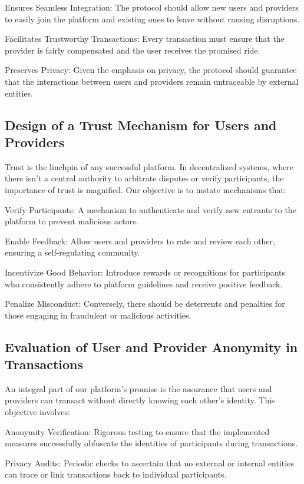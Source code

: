 Ensures Seamless Integration: The protocol should allow new users and providers to easily join the platform and existing ones to leave without causing disruptions.

Facilitates Trustworthy Transactions: Every transaction must ensure that the provider is fairly compensated and the user receives the promised ride.

Preserves Privacy: Given the emphasis on privacy, the protocol should guarantee that the interactions between users and providers remain untraceable by external entities.

\subsection{Design of a Trust Mechanism for Users and Providers}

Trust is the linchpin of any successful platform. In decentralized systems, where there isn't a central authority to arbitrate disputes or verify participants, the importance of trust is magnified. Our objective is to instate mechanisms that:

Verify Participants: A mechanism to authenticate and verify new entrants to the platform to prevent malicious actors.

Enable Feedback: Allow users and providers to rate and review each other, ensuring a self-regulating community.

Incentivize Good Behavior: Introduce rewards or recognitions for participants who consistently adhere to platform guidelines and receive positive feedback.

Penalize Misconduct: Conversely, there should be deterrents and penalties for those engaging in fraudulent or malicious activities.

\subsection{Evaluation of User and Provider Anonymity in Transactions}

An integral part of our platform's promise is the assurance that users and providers can transact without directly knowing each other's identity. This objective involves:

Anonymity Verification: Rigorous testing to ensure that the implemented measures successfully obfuscate the identities of participants during transactions.

Privacy Audits: Periodic checks to ascertain that no external or internal entities can trace or link transactions back to individual participants.

